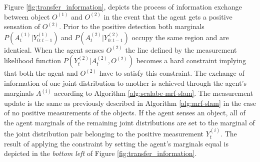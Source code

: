 Figure \ref{fig:transfer_information}, depicts the process of information exchange between object $O^{(1)}$ and $O^{(2)}$ in the event that the agent 
gets a positive sensation of $O^{(2)}$. Prior to the positive detection both marginals $P(A^{(1)}_t|Y^{(1)}_{0:t-1})$ and $P(A^{(2)}_t|Y^{(2)}_{0:t-1})$ 
occupy the same region and are identical. When the agent senses $O^{(2)}$ the line defined by the measurement 
likelihood function $P(Y^{(2)}_t|A^{(2)}_t,O^{(2)})$ becomes a hard constraint implying that both the agent and $O^{(2)}$ have to satisfy this constraint.
The exchange of information of one joint distribution to another is achieved through the agent's marginals $A^{(i)}$ according to Algorithm \ref{alg:scalabe-mrf-slam}.
The measurement update is the same as previously described in Algorithm \ref{alg:mrf-slam} in the case of no positive measurements of the objects. If the agent
senses an object, all of the agent marginals of the remaining joint distributions are set to the marginal of the joint distribution pair belonging to the positive 
measurement $Y^{(i)}_t$. The result of applying the constraint by setting the agent's marginals equal is depicted in the \textit{bottom left} of Figure \ref{fig:transfer_information}.

